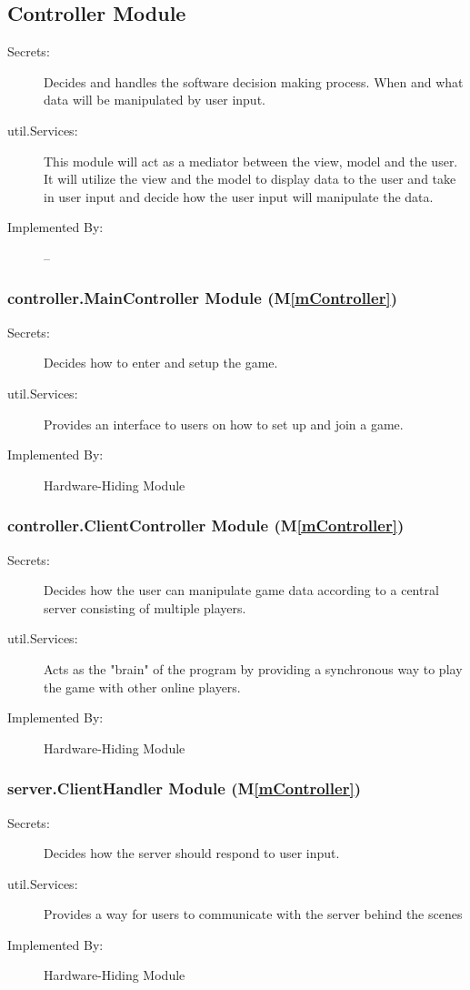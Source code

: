 \documentclass[12pt, titlepage]{article}
\newcommand{\mref}[1]{M\ref{#1}}
\begin{document}

\subsection{Controller Module}

\begin{description}
\item[Secrets:] Decides and handles the software decision making process. When and what data will be manipulated by user input.
\item[util.Services:] This module will act as a mediator between the view, model and the user. It will utilize the view and the model to display data to the user and take in user input and decide how the user input will manipulate the data.
\item[Implemented By:] --
\end{description}

\subsubsection{ controller.MainController Module (\mref{mController})}
    \begin{description}
    \item[Secrets:] Decides how to enter and setup the game.
    \item[util.Services:] Provides an interface to users on how to set up and join a game.
    \item[Implemented By:] Hardware-Hiding Module
    \end{description}

\subsubsection{ controller.ClientController Module (\mref{mController})}
    \begin{description}
    \item[Secrets:] Decides how the user can manipulate game data according to a central server consisting of multiple players.
    \item[util.Services:] Acts as the "brain" of the program by providing a synchronous way to play the game with other online players.
    \item[Implemented By:] Hardware-Hiding Module
    \end{description}

\subsubsection{ server.ClientHandler Module (\mref{mController})}
    \begin{description}
    \item[Secrets:] Decides how the server should respond to user input.
    \item[util.Services:] Provides a way for users to communicate with the server behind the scenes
    \item[Implemented By:] Hardware-Hiding Module
    \end{description}
\end{document}
